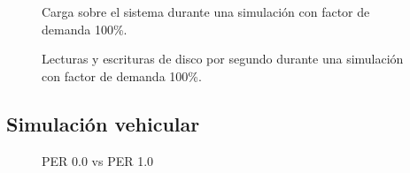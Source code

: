 \begin{figure}[h]
    \centering
    
    \caption{Carga sobre el sistema durante una simulación con factor de demanda 100\%.}
    \label{fig:systemload:cpuram}
\end{figure}
\begin{figure}[h]
    \centering
    
    \caption{Lecturas y escrituras de disco por segundo durante una simulación con factor de demanda 100\%.}
    \label{fig:systemload:io}
\end{figure} 


\subsection{Simulación vehicular}

\begin{figure}
    \centering
    
    \caption{PER 0.0 vs PER 1.0}
    \label{fig:per00per10timedistance}
\end{figure}